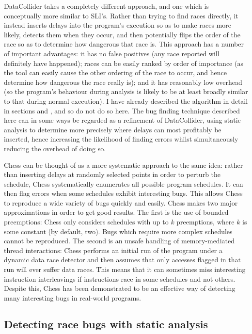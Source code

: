 DataCollider\needCite{} takes a completely different approach, and one
which is conceptually more similar to SLI's.  Rather than trying to
find races directly, it instead inserts delays into the program's
execution so as to make races more likely, detects them when they
occur, and then potentially flips the order of the race so as to
determine how dangerous that race is.  This approach has a number of
important advantages: it has no false positives (any race reported
will definitely have happened); races can be easily ranked by order of
importance (as the tool can easily cause the other ordering of the
race to occur, and hence determine how dangerous the race really is);
and it has reasonably low overhead (so the program's behaviour during
analysis is likely to be at least broadly similar to that during
normal execution).  I have already described the algorithm in detail
in sections  and , and so
do not do so here.  The bug finding technique described here can in
some ways be regarded as a refinement of DataCollider, using static
analysis to determine more precisely where delays can most profitably
be inserted, hence increasing the likelihood of finding errors whilst
simultaneously reducing the overhead of doing so.

Chess\needCite{} can be thought of as a more systematic approach to
the same idea: rather than inserting delays at randomly selected
points in order to perturb the schedule, Chess systematically
enumerates all possible program schedules.  It can then flag errors
when some schedules exhibit interesting bugs.  This allows Chess to
reproduce a wide variety of bugs quickly and easily.  Chess makes two
major approximations in order to get good results.  The first is the
use of bounded preemptions: Chess only considers schedules with up to
$k$ preemptions, where $k$ is some constant (by default, two).  Bugs
which require more complex schedules cannot be reproduced.  The second
is an unsafe handling of memory-mediated thread interactions: Chess
performs an initial run of the program under a dynamic data race
detector and then assumes that only accesses flagged in that run will
ever suffer data races.  This means that it can sometimes miss
interesting instruction interleavings if instructions race in some
schedules and not others.  Despite this, Chess has been demonstrated
to be an effective way of detecting many interesting bugs in
real-world programs.

\subsection{Detecting race bugs with static analysis}

